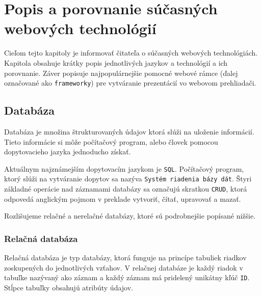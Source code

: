 \chapter{Popis a porovnanie súčasných webových technológií}
\label{kapitola2}
Cieľom tejto kapitoly je informovať čitateľa o súčasných webových technológiách. Kapitola obsahuje krátky popis jednotlivých jazykov a technológií a ich porovnanie. Záver popisuje najpopulárnejšie pomocné webové rámce (ďalej označované ako \texttt{frameworky}) pre vytváranie prezentácií vo webovom prehliadači.

\section{Databáza}
Databáza\cite{database} je množina štrukturovaných údajov ktorá slúži na uloženie informácií. Tieto informácie si môže počítačový program, alebo človek pomocou dopytovacieho jazyka jednoducho získať. 

Aktuálnym najznámejším dopytovacím jazykom je \texttt{SQL}. Počítačový program, ktorý slúži na vytváranie dopytov sa nazýva \texttt{Systém riadenia bázy dát}. Štyri základné operácie nad záznamami databázy sa označujú skratkou \texttt{CRUD}, ktorá odpovedá anglickým pojmom v preklade vytvoriť, čítať, upravovať a mazať. 

Rozlišujeme relačné a nerelačné databázy, ktoré sú podrobnejšie popísané nižšie.

\subsection{Relačná databáza}
Relačná databáza je typ databázy, ktorá funguje na princípe tabuliek riadkov zoskupených do jednotlivých vzťahov. V relačnej databáze je každý riadok v tabuľke nazývaný ako záznam a každý záznam má pridelený unikátny kľúč \texttt{ID}. Stĺpce tabuľky obsahujú atribúty údajov.

